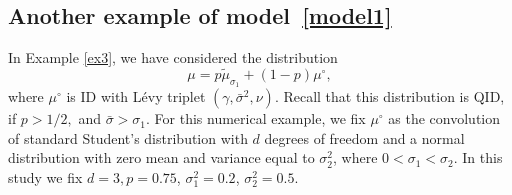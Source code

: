 \documentclass[a4paper,11pt]{article}
\theoremstyle{definition}
\newcommand{\1}{\mathbb{I}}
\theoremstyle{remark}
\begin{document}

    




\subsection{Another example of model~\eqref{model1}}
In Example \ref{ex3}, we have considered the distribution 
\begin{equation*}
    \mu = p\tilde\mu_{\sigma_1} + (1-p) \mu^\circ,
\end{equation*}
where  \(\mu^\circ\) is ID with L{\'e}vy triplet \((\gamma, \bar\sigma^2, \nu)\). Recall that this distribution is QID, if \(p>1/2,\) and \(\bar{\sigma} > \sigma_1\).  For this numerical example, we fix $\mu^\circ$ as the convolution of standard Student's distribution with $d$ degrees of freedom and a normal distribution  with zero mean and  variance equal to \(\sigma_2^2\), where $0 < \sigma_1 < \sigma_2$. In this study we fix $d=3, p = 0.75$, $\sigma^2_1 = 0.2$, $\sigma^2_2 = 0.5$.
\end{document}
